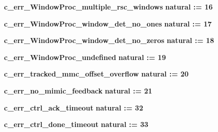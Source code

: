 \begin{DoxyCompactItemize}
\item 
{\bf c\+\_\+err\+\_\+\+Window\+Proc\+\_\+multiple\+\_\+rsc\+\_\+windows} {\bfseries \textcolor{comment}{natural}\textcolor{vhdlchar}{ }\textcolor{vhdlchar}{ }\textcolor{vhdlchar}{\+:}\textcolor{vhdlchar}{=}\textcolor{vhdlchar}{ }\textcolor{vhdlchar}{ } \textcolor{vhdldigit}{16} \textcolor{vhdlchar}{ }} 
\item 
{\bf c\+\_\+err\+\_\+\+Window\+Proc\+\_\+window\+\_\+det\+\_\+no\+\_\+ones} {\bfseries \textcolor{comment}{natural}\textcolor{vhdlchar}{ }\textcolor{vhdlchar}{ }\textcolor{vhdlchar}{\+:}\textcolor{vhdlchar}{=}\textcolor{vhdlchar}{ }\textcolor{vhdlchar}{ } \textcolor{vhdldigit}{17} \textcolor{vhdlchar}{ }} 
\item 
{\bf c\+\_\+err\+\_\+\+Window\+Proc\+\_\+window\+\_\+det\+\_\+no\+\_\+zeros} {\bfseries \textcolor{comment}{natural}\textcolor{vhdlchar}{ }\textcolor{vhdlchar}{ }\textcolor{vhdlchar}{\+:}\textcolor{vhdlchar}{=}\textcolor{vhdlchar}{ }\textcolor{vhdlchar}{ } \textcolor{vhdldigit}{18} \textcolor{vhdlchar}{ }} 
\item 
{\bf c\+\_\+err\+\_\+\+Window\+Proc\+\_\+undefined} {\bfseries \textcolor{comment}{natural}\textcolor{vhdlchar}{ }\textcolor{vhdlchar}{ }\textcolor{vhdlchar}{\+:}\textcolor{vhdlchar}{=}\textcolor{vhdlchar}{ }\textcolor{vhdlchar}{ } \textcolor{vhdldigit}{19} \textcolor{vhdlchar}{ }} 
\item 
{\bf c\+\_\+err\+\_\+tracked\+\_\+mmc\+\_\+offset\+\_\+overflow} {\bfseries \textcolor{comment}{natural}\textcolor{vhdlchar}{ }\textcolor{vhdlchar}{ }\textcolor{vhdlchar}{\+:}\textcolor{vhdlchar}{=}\textcolor{vhdlchar}{ }\textcolor{vhdlchar}{ } \textcolor{vhdldigit}{20} \textcolor{vhdlchar}{ }} 
\item 
{\bf c\+\_\+err\+\_\+no\+\_\+mimic\+\_\+feedback} {\bfseries \textcolor{comment}{natural}\textcolor{vhdlchar}{ }\textcolor{vhdlchar}{ }\textcolor{vhdlchar}{\+:}\textcolor{vhdlchar}{=}\textcolor{vhdlchar}{ }\textcolor{vhdlchar}{ } \textcolor{vhdldigit}{21} \textcolor{vhdlchar}{ }} 
\item 
{\bf c\+\_\+err\+\_\+ctrl\+\_\+ack\+\_\+timeout} {\bfseries \textcolor{comment}{natural}\textcolor{vhdlchar}{ }\textcolor{vhdlchar}{ }\textcolor{vhdlchar}{\+:}\textcolor{vhdlchar}{=}\textcolor{vhdlchar}{ }\textcolor{vhdlchar}{ } \textcolor{vhdldigit}{32} \textcolor{vhdlchar}{ }} 
\item 
{\bf c\+\_\+err\+\_\+ctrl\+\_\+done\+\_\+timeout} {\bfseries \textcolor{comment}{natural}\textcolor{vhdlchar}{ }\textcolor{vhdlchar}{ }\textcolor{vhdlchar}{\+:}\textcolor{vhdlchar}{=}\textcolor{vhdlchar}{ }\textcolor{vhdlchar}{ } \textcolor{vhdldigit}{33} \textcolor{vhdlchar}{ }} 

\end{DoxyCompactItemize}
